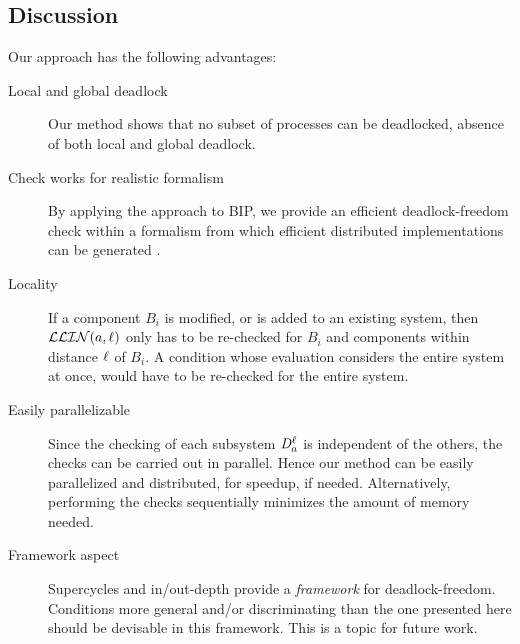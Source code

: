 \subsection{Discussion}
Our approach has the following advantages:
\begin{description}

\item[Local and global deadlock] Our method shows that no subset of processes
  can be deadlocked, \ie absence of both local and global deadlock. 

\item[Check works for realistic formalism]   By applying the approach to BIP, we
provide an efficient deadlock-freedom check within a formalism from
which efficient distributed implementations can be generated
\cite{BonakdarpourBJQS10b}.  

\item[Locality] If a component $B_i$ is modified, or is added to an
  existing system, then $\mathcal{LLIN}(a, \ell)$ only has to
  be re-checked for $B_i$ and components within distance $\ell$ of $B_i$.
  A condition whose evaluation considers the entire
  system at once, \eg \cite{AB03,DFinder2,GS03}
  would have to be re-checked for the entire system. 

\item[Easily parallelizable] Since the checking of each subsystem $\mathit{D}_{a}^{\ell}$
  is independent of the others, the checks can be carried out in parallel. Hence
  our method can be easily parallelized and distributed, for speedup, if needed.
  Alternatively, performing the checks sequentially
  minimizes the amount of memory needed. 

\item[Framework aspect] Supercycles and in/out-depth provide a \emph{framework} for
  deadlock-freedom. Conditions more general and/or discriminating than
  the one presented here 
  should be devisable in this framework. This is a topic for future work.

\end{description}


